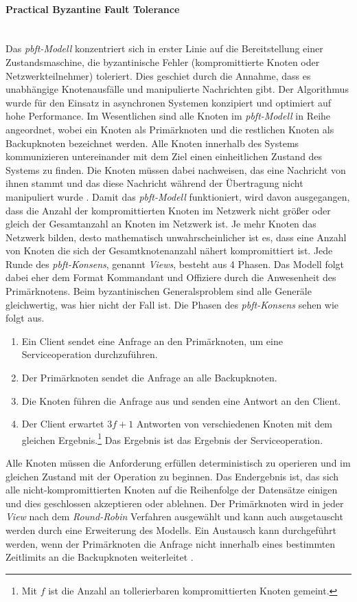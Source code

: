 \paragraph{Practical Byzantine Fault Tolerance}$~~$\\
Das \textit{\ac{pbft}-Modell} konzentriert sich in erster Linie auf die Bereitstellung einer Zustandsmaschine, die byzantinische Fehler (kompromittierte Knoten oder Netzwerkteilnehmer) toleriert. Dies geschiet durch die Annahme, dass es unabhängige Knotenausfälle und manipulierte Nachrichten gibt. Der Algorithmus wurde für den Einsatz in asynchronen Systemen konzipiert und optimiert auf hohe Performance. Im Wesentlichen sind alle Knoten im \textit{\ac{pbft}-Modell} in Reihe angeordnet, wobei ein Knoten als Primärknoten und die restlichen Knoten als Backupknoten bezeichnet werden. Alle Knoten innerhalb des Systems kommunizieren untereinander mit dem Ziel einen einheitlichen Zustand des Systems zu finden. Die Knoten müssen dabei nachweisen, das eine Nachricht von ihnen stammt und das diese Nachricht während der Übertragung nicht manipuliert wurde \citep{Tuan2017}. Damit das \textit{\ac{pbft}-Modell} funktioniert, wird davon ausgegangen, dass die Anzahl der kompromittierten Knoten im Netzwerk nicht größer oder gleich  der Gesamtanzahl an Knoten im Netzwerk ist. Je mehr Knoten das Netzwerk bilden, desto mathematisch unwahrscheinlicher ist es, dass eine Anzahl von Knoten die sich  der Gesamtknotenanzahl nähert kompromittiert ist. Jede Runde des \textit{\ac{pbft}-Konsens}, genannt \textit{Views}, besteht aus 4 Phasen. Das Modell folgt dabei eher dem Format \glqq Kommandant und Offiziere\grqq{} durch die Anwesenheit des Primärknotens. Beim byzantinischen Generalsproblem sind alle Generäle gleichwertig, was hier nicht der Fall ist. Die Phasen des \textit{\ac{pbft}-Konsens} sehen wie folgt aus.

\begin{enumerate}
	\item Ein Client sendet eine Anfrage an den Primärknoten, um eine Serviceoperation durchzuführen.
	\item Der Primärknoten sendet die Anfrage an alle Backupknoten.
	\item Die Knoten führen die Anfrage aus und senden eine Antwort an den Client.
	\item Der Client erwartet \(3f + 1\) Antworten von verschiedenen Knoten mit dem gleichen Ergebnis.\footnote{Mit \(f\) ist die Anzahl an tollerierbaren kompromittierten Knoten gemeint.} Das Ergebnis ist das Ergebnis der Serviceoperation.
\end{enumerate}

Alle Knoten müssen die Anforderung erfüllen deterministisch zu operieren und im gleichen Zustand mit der Operation zu beginnen. Das Endergebnis ist, das sich alle nicht-kompromittierten Knoten auf die Reihenfolge der Datensätze einigen und dies geschlossen akzeptieren oder ablehnen. Der Primärknoten wird in jeder \textit{View} nach dem \textit{Round-Robin} Verfahren ausgewählt und kann auch ausgetauscht werden durch eine Erweiterung des Modells. Ein Austausch kann durchgeführt werden, wenn der Primärknoten die Anfrage nicht innerhalb eines bestimmten Zeitlimits an die Backupknoten weiterleitet \citep{Castro1999}.
